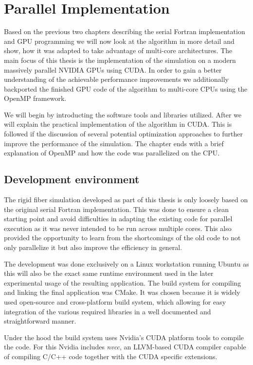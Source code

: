 \documentclass[a4paper,11pt]{kth-mag}
\begin{document}
\chapter{Parallel Implementation}
\label{cha:parallel_implementation}

Based on the previous two chapters describing the serial Fortran implementation and GPU programming we will now look at the algorithm in more detail and show, how it was adapted to take advantage of multi-core architectures. The main focus of this thesis is the implementation of the simulation on a modern massively parallel NVIDIA GPUs using CUDA. In order to gain a better understanding of the achievable performance improvements we additionally backported the finished GPU code of the algorithm to multi-core CPUs using the OpenMP framework.

We will begin by introducting the software tools and libraries utilized. After we will explain the practical implementation of the algorithm in CUDA. This is followed if the discussion of several potential optimization approaches to further improve the performance of the simulation. The chapter ends with a brief explanation of OpenMP and how the code was parallelized on the CPU.

\section{Development environment}

The rigid fiber simulation developed as part of this thesis is only loosely based on the original serial Fortran implementation. This was done to ensure a clean starting point and avoid difficulties in adapting the existing code for parallel execution as it was never intended to be run across multiple cores. This also provided the opportunity to learn from the shortcomings of the old code to not only parallelize it but also improve the efficiency in general.

The development was done exclusively on a Linux workstation running Ubuntu as this will also be the exact same runtime environment used in the later experimental usage of the resulting application. The build system for compiling and linking the final application was CMake. It was chosen because it is widely used open-source and cross-platform build system, which allowing for easy integration of the various required libraries in a well documented and straightforward manner.

Under the hood the build system uses Nvidia's CUDA platform tools to compile the code. For this Nvidia includes \emph{nvcc}, an LLVM-based CUDA compiler capable of compiling C/C++ code together with the CUDA specific extensions.
\end{document}
